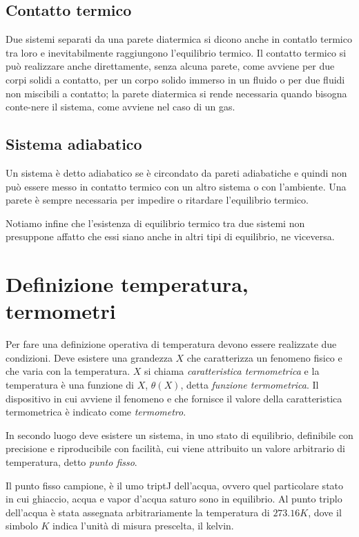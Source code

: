 \documentclass[class=book, crop=false, oneside, 12pt]{standalone}
\begin{document}
\subsection{Contatto termico}

Due sistemi separati da una parete diatermica si dicono anche in contatlo termico tra loro e inevitabilmente raggiungono l'equilibrio termico. 
Il contatto termico si può realizzare anche direttamente, senza alcuna parete, come avviene per due corpi solidi a contatto, per un corpo solido immerso in un fluido o per due fluidi non miscibili a contatto; la parete diatermica si rende necessaria quando bisogna conte-nere il sistema, come avviene nel caso di un gas. 

\subsection{Sistema adiabatico}

Un sistema è detto adiabatico se è circondato da pareti adiabatiche e quindi non può essere messo in contatto termico con un altro sistema o  con l'ambiente. 
Una parete è sempre necessaria per impedire o ritardare l'equilibrio termico. 

Notiamo infine che l'esistenza di equilibrio termico tra due sistemi non presuppone affatto che essi siano anche in altri tipi di equilibrio, ne viceversa.

\section{Definizione temperatura, termometri}

Per fare una definizione operativa di temperatura devono essere realizzate due condizioni. 
Deve esistere una grandezza \(X\) che caratterizza un fenomeno fisico e che varia con la temperatura. 
\(X\) si chiama \emph{caratteristica termometrica} e la temperatura è una funzione di \(X\), \(\theta (X)\), detta \emph{funzione termometrica}. 
Il dispositivo in cui avviene il fenomeno e che fornisce il valore della caratteristica termometrica è indicato come \emph{termometro}.

In secondo luogo deve esistere un sistema, in uno stato di equilibrio, definibile con precisione e riproducibile con facilità, cui viene attribuito un valore arbitrario di temperatura, detto \emph{punto fisso}.

Il punto fisso campione, è il umo triptJ dell'acqua, ovvero quel particolare stato in cui ghiaccio, acqua e vapor d'acqua saturo sono in equilibrio. 
Al punto triplo dell'acqua è stata assegnata arbitrariamente la temperatura di \(273.16 K\), dove il simbolo \(K\) indica l'unità di misura prescelta, il kelvin.
\end{document}
